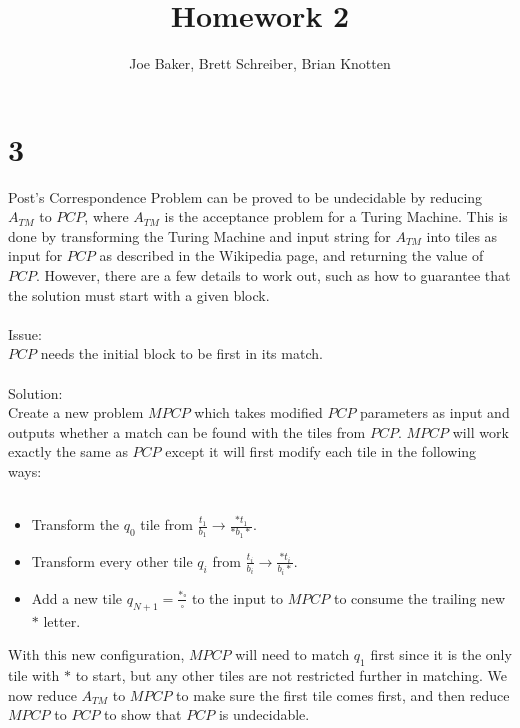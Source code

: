\documentclass[letterpaper,notitlepage,twoside]{article}
\begin{document}
\title{Homework 2}
\author{Joe Baker, Brett Schreiber, Brian Knotten}
\maketitle


\section*{3}
Post's Correspondence Problem can be proved to be undecidable by reducing $A_{TM}$ to $PCP$, where $A_{TM}$ is the acceptance problem for a Turing Machine. This is done by transforming the Turing Machine and input string for $A_{TM}$ into tiles as input for $PCP$ as described in the Wikipedia page, and returning the value of $PCP$. However, there are a few details to work out, such as how to guarantee that the solution must start with a given block.\\\\
Issue:\\
$PCP$ needs the initial block to be first in its match.\\\\
Solution:\\
Create a new problem $MPCP$ which takes modified $PCP$ parameters as input and outputs whether a match can be found with the tiles from $PCP$. $MPCP$ will work exactly the same as $PCP$ except it will first modify each tile in the following ways:\\\\
\begin{itemize}
\item Transform the $q_0$ tile from $\frac{t_1}{b_1} \rightarrow \frac{*t_1}{*b_1*}$.
\item Transform every other tile $q_i$ from $\frac{t_i}{b_i} \rightarrow \frac{*t_i}{b_i*}$.
\item Add a new tile $q_{N+1} = \frac{*\square}{\square}$ to the input to $MPCP$ to consume the trailing new $*$ letter.
\end{itemize}
With this new configuration, $MPCP$ will need to match $q_1$ first since it is the only tile with $*$ to start, but any other tiles are not restricted further in matching. We now reduce $A_{TM}$ to $MPCP$ to make sure the first tile comes first, and then reduce $MPCP$ to $PCP$ to show that $PCP$ is undecidable.
\\\\
\end{document}
